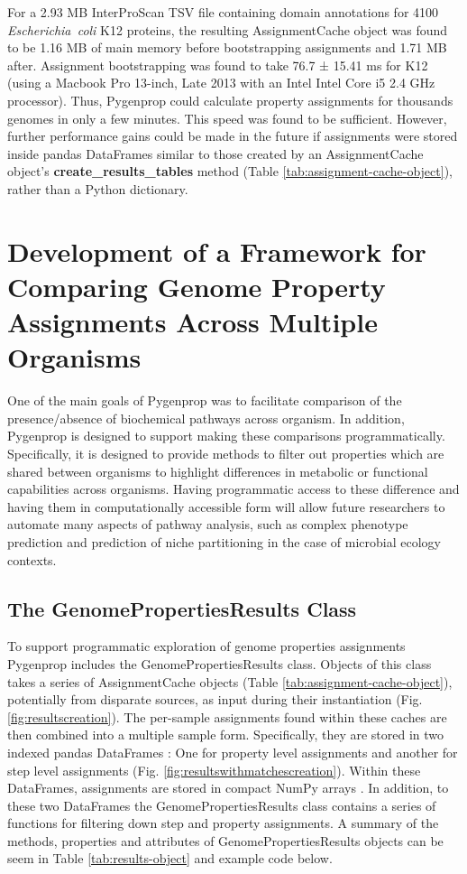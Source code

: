 For a 2.93 MB InterProScan TSV file containing domain annotations for 4100 \textit{Escherichia\ coli }K12 proteins, the resulting AssignmentCache object was found to be 1.16 MB of main memory before bootstrapping assignments and 1.71 MB after. Assignment bootstrapping was found to take 76.7 ± 15.41 ms for K12 (using a Macbook Pro 13-inch, Late 2013 with an Intel Intel Core i5 2.4 GHz processor). Thus, Pygenprop could calculate property assignments for thousands genomes in only a few minutes. This speed was found to be sufficient. However, further performance gains could be made in the future if assignments were stored inside pandas DataFrames \cite{mckinney2010data} similar to those created by an AssignmentCache object's \textbf{create\_results\_tables} method (Table \ref{tab:assignment-cache-object}), rather than a Python dictionary.

\section{Development of a Framework for Comparing Genome Property Assignments Across Multiple Organisms}

One of the main goals of Pygenprop was to facilitate comparison of the presence/absence of biochemical pathways across organism. In addition, Pygenprop is designed to support making these comparisons programmatically. Specifically, it is designed to provide methods to filter out properties which are shared between organisms to highlight differences in metabolic or functional capabilities across organisms. Having programmatic access to these difference and having them in computationally accessible form will allow future researchers to automate many aspects of pathway analysis, such as complex phenotype prediction and prediction of niche partitioning in the case of microbial ecology contexts.

\subsection{The GenomePropertiesResults Class}

To support programmatic exploration of genome properties assignments Pygenprop includes the GenomePropertiesResults class. Objects of this class takes a series of AssignmentCache objects (Table \ref{tab:assignment-cache-object}), potentially from disparate sources, as input during their instantiation (Fig. \ref{fig:resultscreation}). The per-sample assignments found within these caches are then combined into a multiple sample form. Specifically, they are stored in two indexed pandas DataFrames \cite{mckinney2010data}: One for property level assignments and another for step level assignments (Fig. \ref{fig:resultswithmatchescreation}). Within these DataFrames, assignments are stored in compact NumPy arrays \cite{van2011numpy}. In addition, to these two DataFrames the GenomePropertiesResults class contains a series of functions for filtering down step and property assignments. A summary of the methods, properties and attributes of GenomePropertiesResults objects can be seem in Table \ref{tab:results-object} and example code below.

